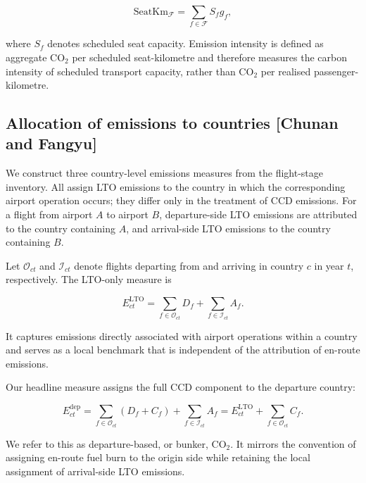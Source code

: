 \documentclass[12pt]{article}
\begin{document}
\begin{equation}
\mathrm{SeatKm}_{\mathcal F}
=
\sum_{f\in\mathcal F} S_f g_f,
\label{eq:nature_6}
\end{equation}

where $S_f$ denotes scheduled seat capacity. Emission intensity is defined as aggregate CO$_2$ per scheduled seat-kilometre and therefore measures the carbon intensity of scheduled transport capacity, rather than CO$_2$ per realised passenger-kilometre.

\subsection*{Allocation of emissions to countries [Chunan and Fangyu]}

We construct three country-level emissions measures from the flight-stage inventory. All assign LTO emissions to the country in which the corresponding airport operation occurs; they differ only in the treatment of CCD emissions. For a flight from airport $A$ to airport $B$, departure-side LTO emissions are attributed to the country containing $A$, and arrival-side LTO emissions to the country containing $B$.

Let $\mathcal O_{ct}$ and $\mathcal I_{ct}$ denote flights departing from and arriving in country $c$ in year $t$, respectively. The LTO-only measure is

\begin{equation}
E_{ct}^{\mathrm{LTO}}
=
\sum_{f\in\mathcal O_{ct}}D_f
+
\sum_{f\in\mathcal I_{ct}}A_f.
\label{eq:nature_7}
\end{equation}

It captures emissions directly associated with airport operations within a country and serves as a local benchmark that is independent of the attribution of en-route emissions.

Our headline measure assigns the full CCD component to the departure country:

\begin{equation}
E_{ct}^{\mathrm{dep}}
=
\sum_{f\in\mathcal O_{ct}}(D_f+C_f)
+
\sum_{f\in\mathcal I_{ct}}A_f
=
E_{ct}^{\mathrm{LTO}}
+
\sum_{f\in\mathcal O_{ct}}C_f.
\label{eq:nature_8}
\end{equation}

We refer to this as departure-based, or bunker, CO$_2$. It mirrors the convention of assigning en-route fuel burn to the origin side while retaining the local assignment of arrival-side LTO emissions.
\end{document}

